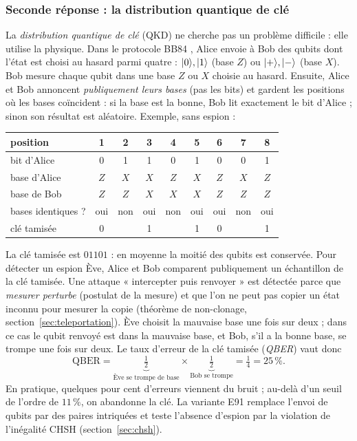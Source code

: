 \subsubsection{Seconde réponse : la distribution quantique de clé}

La \emph{distribution quantique de clé} (QKD) ne cherche pas un problème difficile : elle utilise la physique. Dans le
protocole BB84 \parencite{bennett1984}, Alice envoie à Bob des qubits dont l'état est choisi au hasard parmi quatre :
$|0\rangle,|1\rangle$ (base $Z$) ou $|+\rangle,|-\rangle$ (base $X$). Bob mesure chaque qubit dans une base $Z$ ou $X$ choisie au hasard.
Ensuite, Alice et Bob annoncent \emph{publiquement leurs bases} (pas les bits) et gardent les positions où les bases
coïncident : si la base est la bonne, Bob lit exactement le bit d'Alice ; sinon son résultat est aléatoire. Exemple, sans espion :

\begin{center}
\renewcommand{\arraystretch}{1.15}
\begin{tabular}{@{}l*{8}{c}@{}}
\toprule
position & 1 & 2 & 3 & 4 & 5 & 6 & 7 & 8\\
\midrule
bit d'Alice & 0 & 1 & 1 & 0 & 1 & 0 & 0 & 1\\
base d'Alice & $Z$ & $X$ & $X$ & $Z$ & $X$ & $Z$ & $X$ & $Z$\\
base de Bob & $Z$ & $Z$ & $X$ & $X$ & $X$ & $Z$ & $Z$ & $Z$\\
\midrule
bases identiques ? & oui & non & oui & non & oui & oui & non & oui\\
clé tamisée & 0 & & 1 & & 1 & 0 & & 1\\
\bottomrule
\end{tabular}
\end{center}

La clé tamisée est $01101$ : en moyenne la moitié des qubits est conservée. Pour détecter un espion Ève, Alice et Bob
comparent publiquement un échantillon de la clé tamisée. Une attaque « intercepter puis renvoyer » est détectée parce que
\emph{mesurer perturbe} (postulat de la mesure) et que l'on ne peut pas copier un état inconnu pour mesurer la copie
(théorème de non-clonage, section~\ref{sec:teleportation}). Ève choisit la mauvaise base une fois sur deux ; dans ce cas
le qubit renvoyé est dans la mauvaise base, et Bob, s'il a la bonne base, se trompe une fois sur deux. Le taux d'erreur de la clé tamisée
(\emph{QBER}) vaut donc
\[
  \mathrm{QBER}=\underbrace{\tfrac12}_{\text{Ève se trompe de base}}\times\underbrace{\tfrac12}_{\text{Bob se trompe}}=\tfrac14=25\,\%.
\]
En pratique, quelques pour cent d'erreurs viennent du bruit ; au-delà d'un seuil de l'ordre de $11\,\%$, on abandonne la clé. La
variante E91 \parencite{ekert1991} remplace l'envoi de qubits par des paires intriquées et teste l'absence d'espion par la violation
de l'inégalité CHSH (section~\ref{sec:chsh}).

